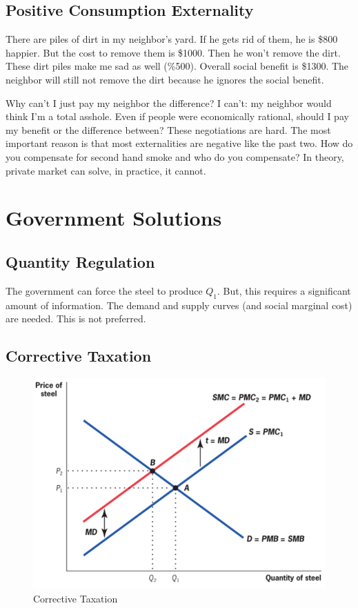 \documentclass{article}
\begin{document}
\subsection{ Positive Consumption Externality }

There are piles of dirt in my neighbor's yard. If he gets rid of them, he is
\$800 happier. But the cost to remove them is \$1000. Then he won't remove the
dirt. These dirt piles make me sad as well (\%500). Overall social benefit is
\$1300. The neighbor will still not remove the dirt because he ignores the
social benefit. 

\bigbreak

Why can't I just pay my neighbor the difference? I can't: my neighbor would
think I'm a total asshole. Even if people were economically rational, should I
pay my benefit or the difference between? These negotiations are hard. The most
important reason is that most externalities are negative like the past two. How
do you compensate for second hand smoke and who do you compensate? In theory,
private market can solve, in practice, it cannot.

\section{ Government Solutions }

\subsection{ Quantity Regulation }

The government can force the steel to produce $Q_{1}$. But, this requires a
significant amount of information. The demand and supply curves (and social
marginal cost) are needed. This is not preferred.

\subsection{ Corrective Taxation }

\begin{figure}[H]
    \centering
    \includegraphics[scale=0.63]{"Corrective Taxation"}
    \caption{Corrective Taxation}
\end{figure}
\end{document}
